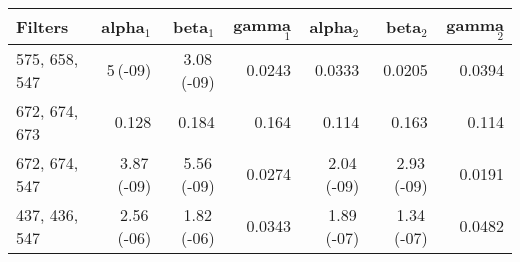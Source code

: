 \begin{tabular}{lrrrrrr}
Filters & alpha$_{\text{1}}$ & beta$_{\text{1}}$ & gamma$_{\text{1}}$ & alpha$_{\text{2}}$ & beta$_{\text{2}}$ & gamma$_{\text{2}}$ \\
\hline
575, 658, 547 & 5\,(-09) & 3.08\,(-09) & 0.0243 & 0.0333 & 0.0205 & 0.0394 \\
672, 674, 673 & 0.128 & 0.184 & 0.164 & 0.114 & 0.163 & 0.114 \\
672, 674, 547 & 3.87\,(-09) & 5.56\,(-09) & 0.0274 & 2.04\,(-09) & 2.93\,(-09) & 0.0191 \\
437, 436, 547 & 2.56\,(-06) & 1.82\,(-06) & 0.0343 & 1.89\,(-07) & 1.34\,(-07) & 0.0482 \\
\end{tabular}
